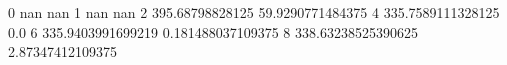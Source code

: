 0 nan nan
1 nan nan
2 395.68798828125 59.9290771484375
4 335.7589111328125 0.0
6 335.9403991699219 0.181488037109375
8 338.63238525390625 2.87347412109375
